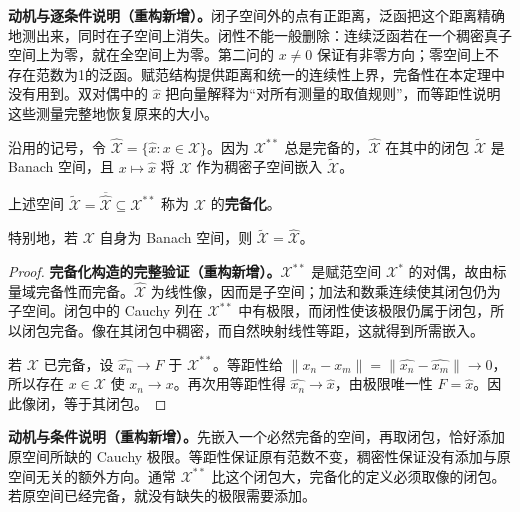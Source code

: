 \documentclass[../../main.tex]{subfiles}
\begin{document}
\begin{remark}
\textbf{动机与逐条件说明（重构新增）。}闭子空间外的点有正距离，泛函把这个距离精确地测出来，同时在子空间上消失。闭性不能一般删除：连续泛函若在一个稠密真子空间上为零，就在全空间上为零。第二问的 $x\ne0$ 保证有非零方向；零空间上不存在范数为1的泛函。赋范结构提供距离和统一的连续性上界，完备性在本定理中没有用到。双对偶中的 $\widehat x$ 把向量解释为“对所有测量的取值规则”，而等距性说明这些测量完整地恢复原来的大小。
\end{remark}
沿用的记号，令 $\widehat{\mathcal X}=\{\widehat x:x\in\mathcal X\}$。因为 $\mathcal X^{**}$ 总是完备的，$\widehat{\mathcal X}$ 在其中的闭包 $\widetilde{\mathcal X}$ 是 Banach 空间，且 $x\mapsto\widehat x$ 将 $\mathcal X$ 作为稠密子空间嵌入 $\widetilde{\mathcal X}$。
\begin{definition}[完备化]\label{definition:ch05-completion}
上述空间 $\widetilde{\mathcal X}=\overline{\widehat{\mathcal X}}\subseteq\mathcal X^{**}$ 称为 $\mathcal X$ 的\textbf{完备化}。
\end{definition}
特别地，若 $\mathcal X$ 自身为 Banach 空间，则 $\widetilde{\mathcal X}=\widehat{\mathcal X}$。
\begin{proof}
\textbf{完备化构造的完整验证（重构新增）。}$\mathcal X^{**}$ 是赋范空间 $\mathcal X^*$ 的对偶，故由标量域完备性而完备。$\widehat{\mathcal X}$ 为线性像，因而是子空间；加法和数乘连续使其闭包仍为子空间。闭包中的 Cauchy 列在 $\mathcal X^{**}$ 中有极限，而闭性使该极限仍属于闭包，所以闭包完备。像在其闭包中稠密，而自然映射线性等距，这就得到所需嵌入。

若 $\mathcal X$ 已完备，设 $\widehat{x_n}\to F$ 于 $\mathcal X^{**}$。等距性给 $\|x_n-x_m\|=\|\widehat{x_n}-\widehat{x_m}\|\to0$，所以存在 $x\in\mathcal X$ 使 $x_n\to x$。再次用等距性得 $\widehat{x_n}\to\widehat x$，由极限唯一性 $F=\widehat x$。因此像闭，等于其闭包。
\end{proof}
\begin{remark}
\textbf{动机与条件说明（重构新增）。}先嵌入一个必然完备的空间，再取闭包，恰好添加原空间所缺的 Cauchy 极限。等距性保证原有范数不变，稠密性保证没有添加与原空间无关的额外方向。通常 $\mathcal X^{**}$ 比这个闭包大，完备化的定义必须取像的闭包。若原空间已经完备，就没有缺失的极限需要添加。
\end{remark}
\end{document}
